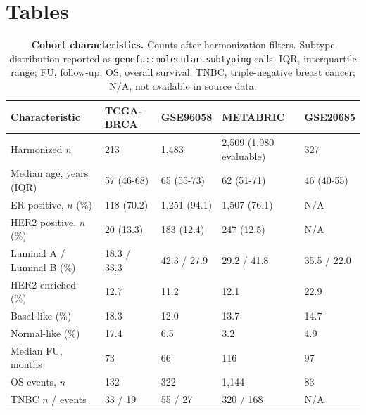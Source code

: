 \documentclass[11pt,letterpaper]{article}
\begin{document}

\clearpage
\section*{Tables}

\begin{table}[H]
\caption{\textbf{Cohort characteristics.} Counts after harmonization filters. Subtype distribution reported as \texttt{genefu::molecular.subtyping} calls. IQR, interquartile range; FU, follow-up; OS, overall survival; TNBC, triple-negative breast cancer; N/A, not available in source data.}
\label{tab:characteristics}
\small
\setlength{\tabcolsep}{4pt}
\begin{tabularx}{\textwidth}{lXXXX}
\toprule
\textbf{Characteristic} & \textbf{TCGA-BRCA} & \textbf{GSE96058} & \textbf{METABRIC} & \textbf{GSE20685} \\
\midrule
Harmonized $n$ & 213 & 1,483 & 2,509 (1,980 evaluable) & 327 \\
Median age, years (IQR) & 57 (46-68) & 65 (55-73) & 62 (51-71) & 46 (40-55) \\
ER positive, $n$ (\%) & 118 (70.2) & 1,251 (94.1) & 1,507 (76.1) & N/A \\
HER2 positive, $n$ (\%) & 20 (13.3) & 183 (12.4) & 247 (12.5) & N/A \\
Luminal A / Luminal B (\%) & 18.3 / 33.3 & 42.3 / 27.9 & 29.2 / 41.8 & 35.5 / 22.0 \\
HER2-enriched (\%) & 12.7 & 11.2 & 12.1 & 22.9 \\
Basal-like (\%) & 18.3 & 12.0 & 13.7 & 14.7 \\
Normal-like (\%) & 17.4 & 6.5 & 3.2 & 4.9 \\
Median FU, months & 73 & 66 & 116 & 97 \\
OS events, $n$ & 132 & 322 & 1,144 & 83 \\
TNBC $n$ / events & 33 / 19 & 55 / 27 & 320 / 168 & N/A \\
\bottomrule
\end{tabularx}
\end{table}
\end{document}
